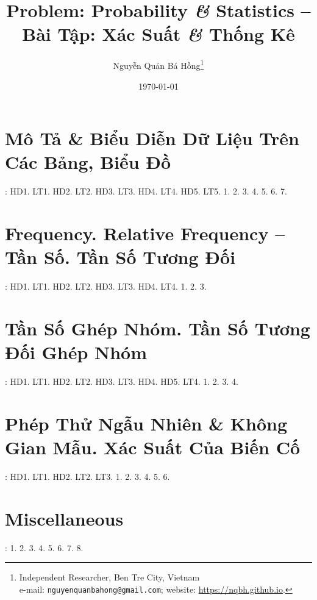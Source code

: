 \documentclass{article}
\title{Problem: Probability {\it\&} Statistics -- Bài Tập: Xác Suất {\it\&} Thống Kê}
\author{Nguyễn Quản Bá Hồng\footnote{Independent Researcher, Ben Tre City, Vietnam\\e-mail: \texttt{nguyenquanbahong@gmail.com}; website: \url{https://nqbh.github.io}.}}
\date{\today}
\begin{document}
\maketitle
\tableofcontents


\section{Mô Tả \& Biểu Diễn Dữ Liệu Trên Các Bảng, Biểu Đồ}
\cite[Chap. VI, \S1, pp. 3--15]{SGK_Toan_9_Canh_Dieu_tap_2}: HD1. LT1. HD2. LT2. HD3. LT3. HD4. LT4. HD5. LT5. 1. 2. 3. 4. 5. 6. 7.


\section{Frequency. Relative Frequency -- Tần Số. Tần Số Tương Đối}
\cite[Chap. VI, \S2, pp. 16--23]{SGK_Toan_9_Canh_Dieu_tap_2}: HD1. LT1. HD2. LT2. HD3. LT3. HD4. LT4. 1. 2. 3.


\section{Tần Số Ghép Nhóm. Tần Số Tương Đối Ghép Nhóm}
\cite[Chap. VI, \S3, pp. 24--34]{SGK_Toan_9_Canh_Dieu_tap_2}: HD1. LT1. HD2. LT2. HD3. LT3. HD4. HD5. LT4. 1. 2. 3. 4.


\section{Phép Thử Ngẫu Nhiên \& Không Gian Mẫu. Xác Suất Của Biến Cố}
\cite[Chap. VI, \S4, pp. 35--39]{SGK_Toan_9_Canh_Dieu_tap_2}: HD1. LT1. HD2. LT2. LT3. 1. 2. 3. 4. 5. 6.


\section{Miscellaneous}
\cite[BTCCVI, pp. 40--42]{SGK_Toan_9_Canh_Dieu_tap_2}: 1. 2. 3. 4. 5. 6. 7. 8.


\printbibliography[heading=bibintoc]
	
\end{document}
